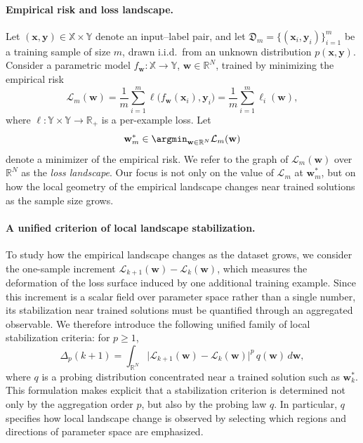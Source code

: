 \documentclass[10pt]{article}
\theoremstyle{plain}
\theoremstyle{remark}
\begin{document}
\paragraph{Empirical risk and loss landscape.}
Let $(\mathbf{x}, \mathbf{y}) \in \mathbb{X} \times \mathbb{Y}$ denote an input--label pair, and let $\mathfrak{D}_m = \{(\mathbf{x}_i, \mathbf{y}_i)\}_{i=1}^m$ be a training sample of size $m$, drawn i.i.d.\ from an unknown distribution $p(\mathbf{x}, \mathbf{y})$.
Consider a parametric model $f_{\mathbf w} : \mathbb{X} \to \mathbb{Y}$, $\mathbf w \in \mathbb{R}^N$, trained by minimizing the empirical risk
\begin{equation}
\label{eq:empirical-loss}
\mathcal{L}_m(\mathbf w)
=
\frac{1}{m}\sum_{i=1}^m \ell\bigl(f_{\mathbf w}(\mathbf x_i), \mathbf y_i\bigr)
=
\frac{1}{m}\sum_{i=1}^m \ell_i(\mathbf w),
\end{equation}
where $\ell:\mathbb{Y}\times\mathbb{Y}\to\mathbb{R}_+$ is a per-example loss.
Let
\begin{equation}
\label{eq:erm-min}
\mathbf w_m^* \in \argmin_{\mathbf w\in\mathbb R^N} \mathcal L_m(\mathbf w)
\end{equation}
denote a minimizer of the empirical risk.
We refer to the graph of $\mathcal L_m(\mathbf w)$ over $\mathbb R^N$ as the \emph{loss landscape}.
Our focus is not only on the value of $\mathcal L_m$ at $\mathbf w_m^*$, but on how the local geometry of the empirical landscape changes near trained solutions as the sample size grows.

\paragraph{A unified criterion of local landscape stabilization.}
To study how the empirical landscape changes as the dataset grows, we consider the one-sample increment $\mathcal L_{k+1}(\mathbf w)-\mathcal L_k(\mathbf w)$, which measures the deformation of the loss surface induced by one additional training example.
Since this increment is a scalar field over parameter space rather than a single number, its stabilization near trained solutions must be quantified through an aggregated observable.
We therefore introduce the following unified family of local stabilization criteria: for $p\ge 1$,
\begin{equation}
\label{eq:general-p-criterion}
\Delta_p(k+1)
=
\int_{\mathbb R^N}
\bigl|
\mathcal L_{k+1}(\mathbf w)-\mathcal L_k(\mathbf w)
\bigr|^p
\, q(\mathbf w)\, d\mathbf w,
\end{equation}
where $q$ is a probing distribution concentrated near a trained solution such as $\mathbf w_k^*$.
This formulation makes explicit that a stabilization criterion is determined not only by the aggregation order $p$, but also by the probing law $q$.
In particular, $q$ specifies how local landscape change is observed by selecting which regions and directions of parameter space are emphasized.
\end{document}
